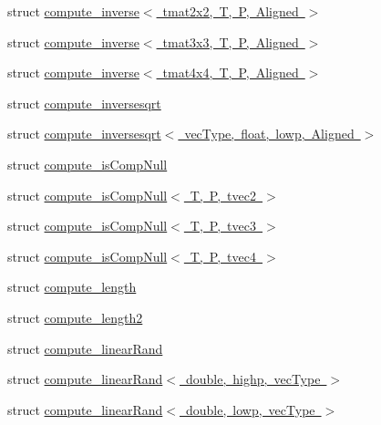 \begin{DoxyCompactItemize}
\item 
struct \mbox{\hyperlink{structglm_1_1detail_1_1compute__inverse_3_01tmat2x2_00_01_t_00_01_p_00_01_aligned_01_4}{compute\+\_\+inverse$<$ tmat2x2, T, P, Aligned $>$}}
\item 
struct \mbox{\hyperlink{structglm_1_1detail_1_1compute__inverse_3_01tmat3x3_00_01_t_00_01_p_00_01_aligned_01_4}{compute\+\_\+inverse$<$ tmat3x3, T, P, Aligned $>$}}
\item 
struct \mbox{\hyperlink{structglm_1_1detail_1_1compute__inverse_3_01tmat4x4_00_01_t_00_01_p_00_01_aligned_01_4}{compute\+\_\+inverse$<$ tmat4x4, T, P, Aligned $>$}}
\item 
struct \mbox{\hyperlink{structglm_1_1detail_1_1compute__inversesqrt}{compute\+\_\+inversesqrt}}
\item 
struct \mbox{\hyperlink{structglm_1_1detail_1_1compute__inversesqrt_3_01vec_type_00_01float_00_01lowp_00_01_aligned_01_4}{compute\+\_\+inversesqrt$<$ vec\+Type, float, lowp, Aligned $>$}}
\item 
struct \mbox{\hyperlink{structglm_1_1detail_1_1compute__is_comp_null}{compute\+\_\+is\+Comp\+Null}}
\item 
struct \mbox{\hyperlink{structglm_1_1detail_1_1compute__is_comp_null_3_01_t_00_01_p_00_01tvec2_01_4}{compute\+\_\+is\+Comp\+Null$<$ T, P, tvec2 $>$}}
\item 
struct \mbox{\hyperlink{structglm_1_1detail_1_1compute__is_comp_null_3_01_t_00_01_p_00_01tvec3_01_4}{compute\+\_\+is\+Comp\+Null$<$ T, P, tvec3 $>$}}
\item 
struct \mbox{\hyperlink{structglm_1_1detail_1_1compute__is_comp_null_3_01_t_00_01_p_00_01tvec4_01_4}{compute\+\_\+is\+Comp\+Null$<$ T, P, tvec4 $>$}}
\item 
struct \mbox{\hyperlink{structglm_1_1detail_1_1compute__length}{compute\+\_\+length}}
\item 
struct \mbox{\hyperlink{structglm_1_1detail_1_1compute__length2}{compute\+\_\+length2}}
\item 
struct \mbox{\hyperlink{structglm_1_1detail_1_1compute__linear_rand}{compute\+\_\+linear\+Rand}}
\item 
struct \mbox{\hyperlink{structglm_1_1detail_1_1compute__linear_rand_3_01double_00_01highp_00_01vec_type_01_4}{compute\+\_\+linear\+Rand$<$ double, highp, vec\+Type $>$}}
\item 
struct \mbox{\hyperlink{structglm_1_1detail_1_1compute__linear_rand_3_01double_00_01lowp_00_01vec_type_01_4}{compute\+\_\+linear\+Rand$<$ double, lowp, vec\+Type $>$}}
\item 

\end{DoxyCompactItemize}
